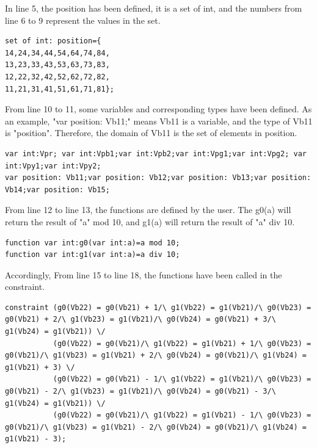 In line 5, the position has been defined, it is a set of int, and the numbers from line 6 to 9 represent the values in the set.
\begin{lstlisting}[language=minizinc,firstnumber=5]
set of int: position={
14,24,34,44,54,64,74,84,
13,23,33,43,53,63,73,83,
12,22,32,42,52,62,72,82,
11,21,31,41,51,61,71,81};
\end{lstlisting}
From line 10 to 11, some variables and corresponding types have been defined. As an example, "var position: Vb11;" means Vb11 is a variable, and the type of Vb11 is "position". Therefore, the domain of Vb11 is the set of elements in position.
\begin{lstlisting}[language=minizinc,firstnumber=10]
var int:Vpr; var int:Vpb1;var int:Vpb2;var int:Vpg1;var int:Vpg2; var int:Vpy1;var int:Vpy2;
var position: Vb11;var position: Vb12;var position: Vb13;var position: Vb14;var position: Vb15;
\end{lstlisting}
From line 12 to line 13, the functions are defined by the user. The g0(a) will return the result of "a" mod 10, and g1(a) will return the result of "a" div 10.
\begin{lstlisting}[language=minizinc,firstnumber=12]
function var int:g0(var int:a)=a mod 10;
function var int:g1(var int:a)=a div 10;
\end{lstlisting}
Accordingly, From line 15 to line 18, the functions have been called in the constraint.
\begin{lstlisting}[language=minizinc,firstnumber=14]
%blue piece2 
constraint (g0(Vb22) = g0(Vb21) + 1/\ g1(Vb22) = g1(Vb21)/\ g0(Vb23) = g0(Vb21) + 2/\ g1(Vb23) = g1(Vb21)/\ g0(Vb24) = g0(Vb21) + 3/\ g1(Vb24) = g1(Vb21)) \/
           (g0(Vb22) = g0(Vb21)/\ g1(Vb22) = g1(Vb21) + 1/\ g0(Vb23) = g0(Vb21)/\ g1(Vb23) = g1(Vb21) + 2/\ g0(Vb24) = g0(Vb21)/\ g1(Vb24) = g1(Vb21) + 3) \/
           (g0(Vb22) = g0(Vb21) - 1/\ g1(Vb22) = g1(Vb21)/\ g0(Vb23) = g0(Vb21) - 2/\ g1(Vb23) = g1(Vb21)/\ g0(Vb24) = g0(Vb21) - 3/\ g1(Vb24) = g1(Vb21)) \/
           (g0(Vb22) = g0(Vb21)/\ g1(Vb22) = g1(Vb21) - 1/\ g0(Vb23) = g0(Vb21)/\ g1(Vb23) = g1(Vb21) - 2/\ g0(Vb24) = g0(Vb21)/\ g1(Vb24) = g1(Vb21) - 3);
\end{lstlisting}

